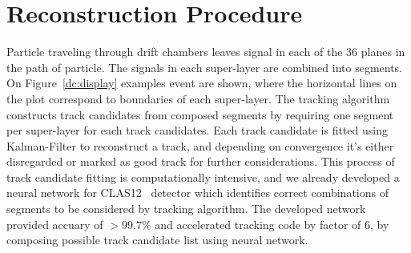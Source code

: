 \documentclass[12pt]{article}
\begin{document}
\section{Reconstruction Procedure}

\indent

Particle traveling through drift chambers leaves signal in each of the 36 planes in the path of particle. The signals in each super-layer are combined into segments. On Figure~\ref{dc:display} examples event are shown, where the horizontal lines on the plot correspond to boundaries of each super-layer. The tracking algorithm constructs track candidates from composed segments by requiring one segment per super-layer for each track candidates. Each track candidate is fitted using Kalman-Filter to reconstruct a track, and depending on convergence it's either disregarded or marked as good track for further considerations. This process of track candidate fitting is computationally intensive, and we already developed a neural network for CLAS12~\cite{Gavalian:2020oxg} detector which identifies correct combinations of segments to be considered by tracking algorithm. The developed network provided accuary of $>99.7\%$ and accelerated tracking code by factor of 6, by composing possible track candidate list using neural network.
\end{document}
